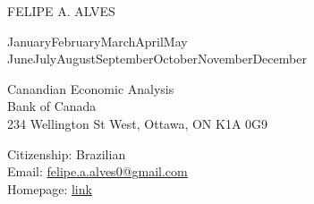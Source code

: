 \documentclass[11pt,letterpaper]{article}
\def\name{Felipe A. Alves}
\renewcommand{\today}{\ifcase \month \or January\or February\or March\or April\or May%
\or June\or July\or August\or September\or October\or November\or December\fi%
\space \number \year}
\begin{document}
{\sectionface\large \MakeUppercase{\name} }



\today

\bigskip
\begin{minipage}[t]{0.495\textwidth}
  Canandian Economic Analysis \\
  Bank of Canada \\
  234 Wellington St West, Ottawa, ON K1A 0G9 \\
\end{minipage}
\begin{minipage}[t]{0.495\textwidth}
  Citizenship: Brazilian \\
  Email: \href{mailto:felipe.a.alves0@gmail.com}{felipe.a.alves0@gmail.com} \\
  Homepage: \href{https://sites.google.com/view/felipe-alves}{link}
\end{minipage}

\medskip


\iffalse
\section*{References}
\begin{minipage}[t]{0.495\textwidth}
  {\large Giovanni L. Violante} \\
  Email: \href{mailto:glv2@princeton.edu}{glv2@princeton.edu} \\
\end{minipage}
\begin{minipage}[t]{0.495\textwidth}
  {\large Venky Venkateswaran} \\
  Email: \href{mailto:vvenkate@gmail.com}{vvenkate@gmail.com} \\
\end{minipage}
\fi
\end{document}
